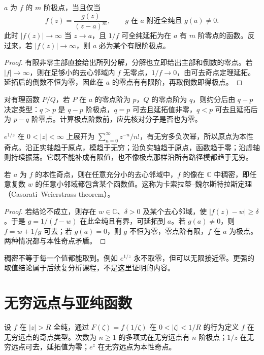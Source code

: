\documentclass[UTF8,12pt,a4paper,fontset=fandol]{ctexbook}
\begin{document}
\begin{proposition}[极点判别]
\label{prop:cv-pole}
$a$ 为 $f$ 的 $m$ 阶极点，当且仅当
\[
 f(z)=\frac{g(z)}{(z-a)^m},\qquad g\text{ 在 }a\text{ 附近全纯且 }g(a)\ne0.
\]
此时 $|f(z)|\to\infty$ 当 $z\to a$，且 $1/f$ 可全纯延拓为在 $a$ 有 $m$ 阶零点的函数。反过来，若 $|f(z)|\to\infty$，则 $a$ 必为某个有限阶极点。
\end{proposition}
\begin{proof}
有限非零主部直接给出所列分解，分解也立即给出主部和倒数的零点。若 $|f|\to\infty$，则在足够小的去心邻域内 $f$ 无零点，$1/f\to0$，由可去奇点定理延拓。延拓后的倒数不恒为零，因此在 $a$ 的零点有有限阶，再取倒数即得极点。
\end{proof}

对有理函数 $P/Q$，若 $P$ 在 $a$ 的零点阶为 $p$，$Q$ 的零点阶为 $q$，则约分后由 $q-p$ 决定类型：$q>p$ 是 $q-p$ 阶极点，$q=p$ 可去且延拓值非零，$q<p$ 可去且延拓后为 $p-q$ 阶零点。计算极点阶数前，应先核对分子是否也为零。

\begin{example}[本性奇点的典型行为]
$e^{1/z}$ 在 $0<|z|<\infty$ 上展开为 $\sum_{n=0}^\infty z^{-n}/n!$，有无穷多负次幂，所以原点为本性奇点。沿正实轴趋于原点，模趋于无穷；沿负实轴趋于原点，函数趋于零；沿虚轴则持续振荡。它既不能补成有限值，也不像极点那样沿所有路径模都趋于无穷。
\end{example}

\begin{theorem}[本性奇点附近的稠密性]
\label{thm:cv-casorati}
若 $a$ 为 $f$ 的本性奇点，则在任意充分小的去心邻域中，$f$ 的像在 $\mathbb C$ 中稠密，即任意复数 $w$ 的任意小邻域都包含某个函数值。这称为卡索拉蒂--魏尔斯特拉斯定理（Casorati--Weierstrass theorem）。
\end{theorem}
\begin{proof}
若结论不成立，则存在 $w\in\mathbb C$、$\delta>0$ 及某个去心邻域，使 $|f(z)-w|\ge\delta$。于是 $g=1/(f-w)$ 在此全纯且有界，可延拓到 $a$。若 $g(a)\ne0$，则 $f=w+1/g$ 可去；若 $g(a)=0$，则 $g$ 不恒为零，零点阶有限，$f$ 在 $a$ 为极点。两种情况都与本性奇点矛盾。
\end{proof}

稠密不等于每一个值都能取到。例如 $e^{1/z}$ 永不取零，但可以无限接近零。更强的取值结论属于后续复分析课程，不是这里证明的内容。

\section{无穷远点与亚纯函数}

设 $f$ 在 $|z|>R$ 全纯，通过 $F(\zeta)=f(1/\zeta)$ 在 $0<|\zeta|<1/R$ 的行为定义 $f$ 在无穷远点的奇点类型。次数为 $n\ge1$ 的多项式在无穷远点有 $n$ 阶极点；$1/z$ 在无穷远点可去，延拓值为零；$e^z$ 在无穷远点为本性奇点。
\end{document}
